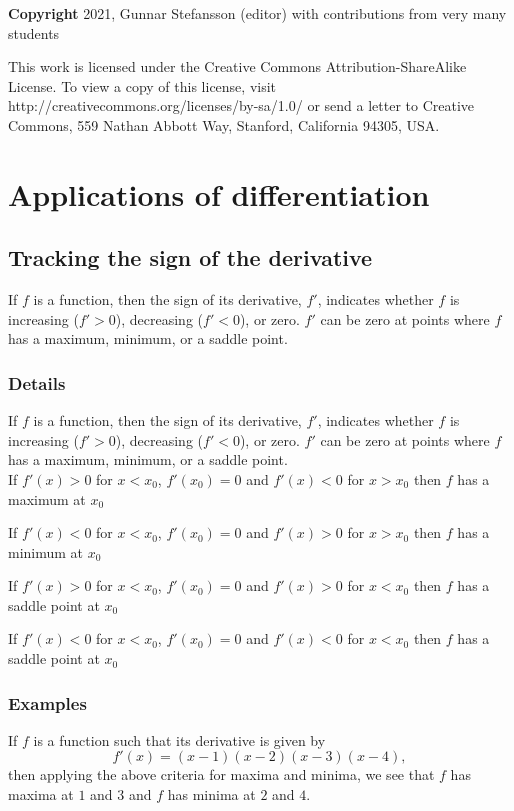 \documentclass[12pt,a4paper]{article}
\theoremstyle{regla}
\theoremstyle{remark}
\theoremstyle{definition}
\theoremstyle{nonumberbreak}
\begin{document}
{\bf Copyright}
2021, Gunnar Stefansson (editor) with contributions from very many students

This work is licensed under the Creative Commons
Attribution-ShareAlike License. To view a copy of this license, visit
http://creativecommons.org/licenses/by-sa/1.0/ or send a letter to
Creative Commons, 559 Nathan Abbott Way, Stanford, California 94305,
USA.
\clearpage
\section{Applications of differentiation}
\subsection{Tracking the sign of the derivative}
\begin{fbox}
\begin{minipage}{0.97\textwidth}
If $f$ is a function, then the sign of its derivative, $f'$, indicates whether $f$ is increasing ($f'>0$), decreasing ($f'<0$), or zero. $f'$ can be zero at points where $f$ has a maximum, minimum, or a saddle point.

\end{minipage}
\end{fbox}
\subsubsection{Details}
If $f$ is a function, then the sign of its derivative, $f'$, indicates whether $f$ is increasing ($f'>0$), decreasing ($f'<0$), or zero. $f'$ can be zero at points where $f$ has a maximum, minimum, or a saddle point.\\

If $f'(x)>0$ for $x< x_0$, $f'(x_0)=0$ and $f'(x)<0$ for $x>x_0$ then $f$ has  a maximum at $x_0$ 

If $f'(x)<0$ for $x< x_0$, $f'(x_0)=0$ and $f'(x)>0$ for $x>x_0$ then  $f$ has   a minimum at $x_0$ 

If $f'(x)>0$ for $x< x_0$, $f'(x_0)=0$ and $f'(x)>0$ for $x< x_0$ then  $f$ has   a saddle point at $x_0$ 

If $f'(x)<0$ for $x< x_0$, $f'(x_0)=0$ and $f'(x)<0$ for $x< x_0$ then  $f$ has   a saddle point at $x_0$

\subsubsection{Examples}
\begin{xmpl}
If $f$ is a function such that its derivative is given by
$$
f'(x) = (x-1)(x-2)(x-3)(x-4),$$
then applying the above criteria for maxima and minima, we see that $f$ has maxima at $1$ and $3$ and $f$ has minima at $2$ and $4$.
\end{xmpl}
\end{document}
